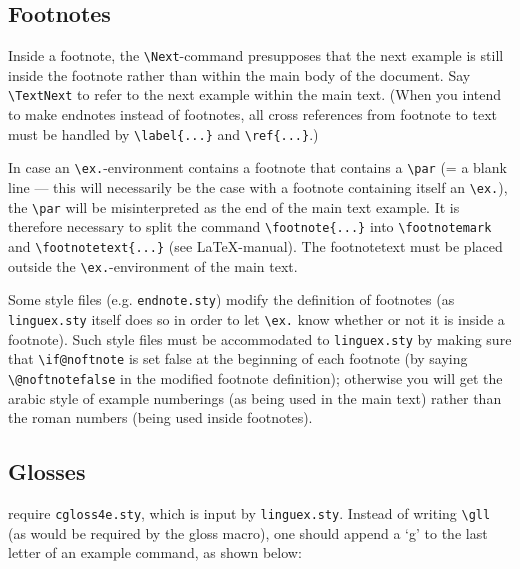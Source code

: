 \documentclass{article}
\begin{document}
\subsection*{Footnotes}%
Inside a footnote, the \verb-\Next--command presupposes that the next 
example is still inside the footnote rather than within the main body 
of the document.  Say \verb-\TextNext- to refer to the next example within the 
main text.  (When you intend to make endnotes instead of footnotes, 
all cross references from footnote to text must be handled by 
\verb-\label{...}- and \verb-\ref{...}-.)

In case an \verb-\ex.--environment contains a footnote that contains a 
\verb-\par- (= a blank line --- this will necessarily be the case with a 
footnote containing itself an \verb-\ex.-), the \verb-\par- will be 
misinterpreted as the end of the main text example.  It is therefore 
necessary to split the command \verb-\footnote{...}- into 
\verb-\footnotemark- and \verb-\footnotetext{...}- (see 
\LaTeX-manual).  The footnotetext must be placed outside the 
\verb-\ex.--environment of the main text.

Some style files (e.g.  {\tt endnote.sty}) modify the definition of 
footnotes (as {\tt linguex.sty} itself does so in order to let \verb|\ex.| know 
whether or not it is inside a footnote).  Such style files must be 
accommodated to {\tt linguex.sty} by making sure that \verb-\if@noftnote- is 
set false at the beginning of each footnote (by saying 
\verb-\@noftnotefalse- in the modified footnote definition); otherwise 
you will get the arabic style of example numberings (as being used in 
the main text) rather than the roman numbers (being used inside 
footnotes).


\subsection*{Glosses}%
require {\tt cgloss4e.sty}, which is input by {\tt linguex.sty}.  
Instead of writing \verb.\gll.  (as would be required by the gloss 
macro), one should append a `g' to the last letter of an example 
command, as shown below:
\end{document}
